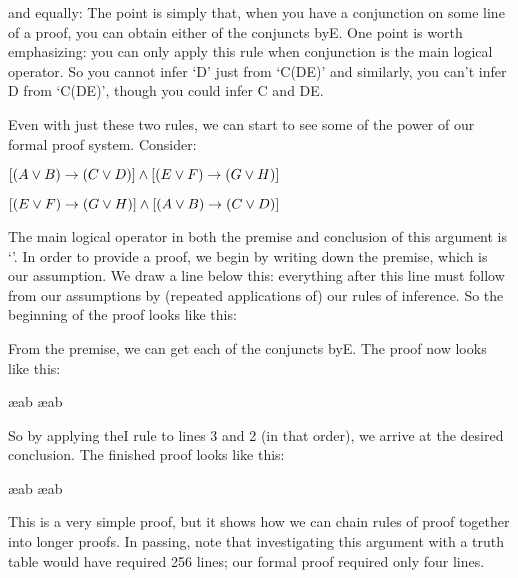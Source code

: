 and equally:
The point is simply that, when you have a conjunction on some line of a proof, you can obtain either of the conjuncts by\eand E. One point is worth emphasizing: you can only apply this rule when conjunction is the main logical operator. So you cannot infer ‘D’ just from ‘C\eor (D\eand E)’ and similarly, you can't infer D from ‘C\eand (D\eor E)’, though you could infer C and D\eor E.

Even with just these two rules, we can start to see some of the power of our formal proof system. Consider:
\begin{earg}
\item[] $[(A\vee B)\rightarrow(C\vee D)]\wedge [(E\vee F)\rightarrow (G\vee H)]$
\item[\therefore] $[(E\vee F)\rightarrow (G\vee H)]\wedge [(A\vee B)\rightarrow(C\vee D)]$
\end{earg}
The main logical operator in both the premise and conclusion of this argument is ‘\eand ’. In order to provide a proof, we begin by writing down the premise, which is our assumption. We draw a line below this: everything after this line must follow from our assumptions by (repeated applications of) our rules of inference. So the beginning of the proof looks like this:
\begin{fitchproof}
\end{fitchproof}
From the premise, we can get each of the conjuncts by\eand E. The proof now looks like this:

\begin{fitchproof}
 \ae{ab}
 \ae{ab}
\end{fitchproof}

So by applying the\eand I rule to lines 3 and 2 (in that order), we arrive at the desired conclusion. The finished proof looks like this:
\begin{fitchproof}
 \ae{ab}
 \ae{ab}
 
\end{fitchproof}
This is a very simple proof, but it shows how we can chain rules of proof together into longer proofs. In passing, note that investigating this argument with a truth table would have required 256 lines; our formal proof required only four lines.

